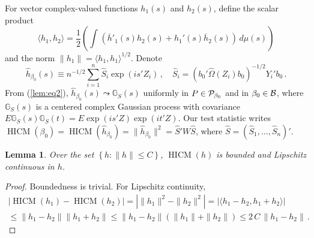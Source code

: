 \documentclass[12pt]{article}
\newcommand{\1}{\mathbf{1}}
\newcommand{\HICM}{\operatorname{HICM}}
\newcommand{\ip}[2]{\langle #1,#2 \rangle}
\newcounter{thm}[section]
\newtheorem{lem}[thm]{Lemma}
\begin{document}
For  vector complex-valued functions $h_{1}(s)$ and $h_{2} (s)$,
define the scalar product
\[
\ip{h_{1}}{h_{2}}  = \frac{1}{2}
\left(
  \int_{}^{}{  \left( \overline{h}'_{1}(s) {h}_{2}(s) + h_{1}'(s)
  \overline{h}_{2} (s) \right)
  \, d\mu (s)}
\right)
\]
and the norm
$ \| h_{1} \|  = \ip{h_{1}}{h_{1}}^{1/2}$.
Denote
\[
\widehat{h}_{\beta_{0}} (s) \equiv n^{-1/2} \sum_{i=1}^{n}{
\widehat{S}_{i} \exp(i s'Z_{i})}
\, ,
\quad \widehat{S}_{i} = \left( b_0'\widehat{\Omega}(Z_i) b_0 \right)^{-1/2}
Y_i'b_0
\, .
\]
From  (\ref{lem:eq2}), $\widehat{h}_{\beta_0}(s) \leadsto  \mathbb{G}_{S}(s)$
uniformly in $P \in {\cal P}_{\beta_0}$ and in $\beta_{0} \in {\cal B}$, where
$\mathbb{G}_{S}(s)$ is a centered complex Gaussian process with
covariance $
E \mathbb{G}_{S}(s) \mathbb{G}_{S}(t) = E  \exp(i s'Z)  \exp(i t'Z)$.
Our test statistic writes $\HICM (\beta_{0}) = \HICM (\widehat{h}_{\beta_{0}}) =
\|\widehat{h}_{\beta_0}\|^{2} = \widehat{S}'W\widehat{S}$, where
$\widehat{S} = \left( \widehat{S}_{1}, \ldots, \widehat{S}_{n} \right)'$.


\begin{lem}
Over the set $\left\{ h : \|h\| \leq C\right\}$,
 $\HICM (h)$ is bounded and Lipschitz continuous in $h$.
\label{lem:lip}
\end{lem}
\begin{proof}
Boundedness is trivial. For Lipschitz continuity,
\begin{multline*}
\left| \HICM (h_{1}) - \HICM (h_{2}) \right|
= \left| \|h_{1}\|^{2} - \|h_{2}\|^{2} \right|
 = \left| \ip{h_{1}-h_{2}}{h_{1} + h_{2}} \right|
\\
 \leq \|h_{1} - h_{2} \| \|h_{1} + h_{2}\|
 \leq \|h_{1} - h_{2} \| ( \|h_{1}\| + \|h_{2}\| ) \leq 2\, {C} \,
\|h_{1} - h_{2} \|
\, .
\tag*{\qedhere}
\end{multline*}
\end{proof}
\end{document}
